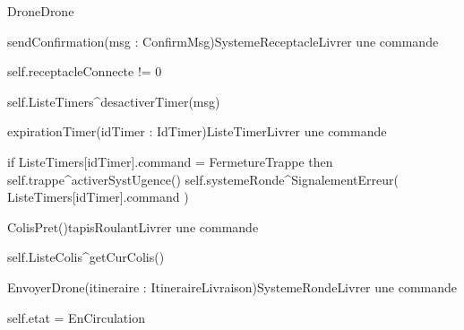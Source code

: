\begin{OM}{Drone}{Drone}
    \begin{OMOperation}{sendConfirmation(msg : ConfirmMsg)}{SystemeReceptacle}{Livrer une commande}
        \begin{OMMessages}
        \end{OMMessages}
        \begin{OMPre}
self.receptacleConnecte != 0
        \end{OMPre}
        \begin{OMPost}
self.ListeTimers^desactiverTimer(msg)
        \end{OMPost}
    \end{OMOperation}

    \begin{OMOperation}{expirationTimer(idTimer : IdTimer)}{ListeTimer}{Livrer une commande}
        \begin{OMMessages}
        \end{OMMessages}
        \OMNoPre
        \begin{OMPost}
if ListeTimers[idTimer].command = FermetureTrappe then
    self.trappe^activerSystUgence()
self.systemeRonde^SignalementErreur( ListeTimers[idTimer].command )
        \end{OMPost}
    \end{OMOperation}

    \begin{OMOperation}{ColisPret()}{tapisRoulant}{Livrer une commande}
        \begin{OMMessages}
        \end{OMMessages}
        \OMNoPre
        \begin{OMPost}
self.ListeColis^getCurColis()
        \end{OMPost}
    \end{OMOperation}

    \begin{OMOperation}{EnvoyerDrone(itineraire : ItineraireLivraison)}{SystemeRonde}{Livrer une commande}
        \OMNoMessages
        \OMNoPre
        \begin{OMPost}
self.etat = EnCirculation
        \end{OMPost}
    \end{OMOperation}
\end{OM}
